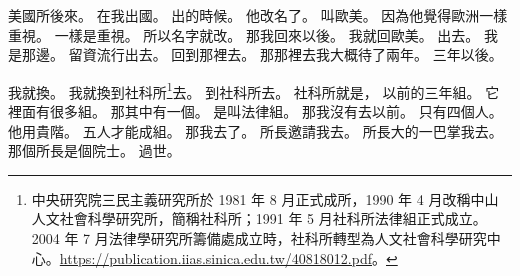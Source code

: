 \hypertarget{c01:cue:3855}{}美國所後來。
\hypertarget{c01:cue:3856}{}在我出國。
\hypertarget{c01:cue:3857}{}出的時候。
\hypertarget{c01:cue:3858}{}他改名了。
\hypertarget{c01:cue:3859}{}叫歐美。
\hypertarget{c01:cue:3860}{}因為他覺得歐洲一樣重視。
\hypertarget{c01:cue:3861}{}一樣是重視。
\hypertarget{c01:cue:3862}{}所以名字就改。
\hypertarget{c01:cue:3863}{}那我回來以後。
\hypertarget{c01:cue:3864}{}我就回歐美。
\hypertarget{c01:cue:3865}{}出去。
\hypertarget{c01:cue:3866}{}我是那邊。
\hypertarget{c01:cue:3867}{}留資流行出去。
\hypertarget{c01:cue:3868}{}回到那裡去。
\hypertarget{c01:cue:3869}{}那那裡去我大概待了兩年。
\hypertarget{c01:cue:3870}{}三年以後。

\hypertarget{c01:cue:3871}{}我就換。
\hypertarget{c01:cue:3872}{}我就換到社科所\footnote{中央研究院三民主義研究所於 1981 年 8 月正式成所，1990 年 4 月改稱中山人文社會科學研究所，簡稱社科所；1991 年 5 月社科所法律組正式成立。2004 年 7 月法律學研究所籌備處成立時，社科所轉型為人文社會科學研究中心。\url{https://publication.iias.sinica.edu.tw/40818012.pdf}。}去。
\hypertarget{c01:cue:3873}{}到社科所去。
\hypertarget{c01:cue:3874}{}社科所就是，
\hypertarget{c01:cue:3875}{}以前的三年組。
\hypertarget{c01:cue:3876}{}它裡面有很多組。
\hypertarget{c01:cue:3877}{}那其中有一個。
\hypertarget{c01:cue:3878}{}是叫法律組。
\hypertarget{c01:cue:3879}{}那我沒有去以前。
\hypertarget{c01:cue:3880}{}只有四個人。
\hypertarget{c01:cue:3881}{}他用貴階。
\hypertarget{c01:cue:3882}{}五人才能成組。
\hypertarget{c01:cue:3883}{}那我去了。
\hypertarget{c01:cue:3884}{}所長邀請我去。
\hypertarget{c01:cue:3885}{}所長大的一巴掌我去。
\hypertarget{c01:cue:3886}{}那個所長是個院士。
\hypertarget{c01:cue:3887}{}過世。

